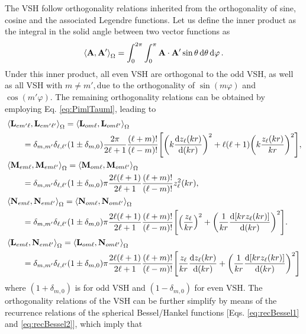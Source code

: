 The VSH follow orthogonality relations inherited from the orthogonality of sine, cosine and the associated Legendre functions. Let us define the inner product as the integral in the solid angle between two vector functions as
%
\begin{align}
\ev{\vb{A},\vb{A}'}_\Omega = \int_0^{2\pi}\int_0^{\pi} \vb{A}\cdot\vb{A}'\sin\theta\dd{\theta}\dd{\varphi}.
\label{eq:inner}
\end{align}
%
Under this inner product, all even VSH are orthogonal to the odd VSH, as well as all VSH  with $m\neq m', $due to the orthogonality of $\sin(m\varphi)$ and $\cos(m'\varphi)$. The remaining orthogonality relations  can be obtained by employing Eq. \eqref{eq:PimlTauml}, leading to
%
\begin{align}
&\ev{\vb{L}_{em'\ell},\vb{L}_{em'\ell'}}_\Omega = \ev{\vb{L}_{om\ell},\vb{L}_{om\ell'}}_\Omega \notag\\
	 &\hspace*{2em} =
 	\delta_{m,m'}\delta_{\ell,\ell'} (1\pm\delta_{m,0})
 	\frac{2\pi}{2\ell+1}\frac{(\ell+m)!}{(\ell-m)!}
 	\qty[\qty(k\dv{z_\ell(kr)}{(kr)})^2 + \ell(\ell+1)\qty(k\frac{z_\ell(kr)}{kr})^2],
    \label{eq:LL}\\
%
&\ev{\vb{M}_{em\ell},\vb{M}_{em\ell'}}_\Omega = \ev{\vb{M}_{om\ell},\vb{M}_{om\ell'}}_\Omega \notag\\
		 &\hspace*{2em} =
	\delta_{m,m'}\delta_{\ell,\ell'} (1\pm\delta_{m,0})
	\pi \frac{2  \ell(\ell+1)}{2\ell+1}\frac{(\ell+m)!}{(\ell-m)!}
	z_{\ell}^2(kr),\\
%
&\ev{\vb{N}_{em\ell},\vb{N}_{em\ell'}}_\Omega = \ev{\vb{N}_{om\ell},\vb{N}_{om\ell'}}_\Omega  \notag\\
	 &\hspace*{2em} =
	 \delta_{m,m'}\delta_{\ell,\ell'} (1\pm\delta_{m,0})
	\pi \frac{2  \ell(\ell+1)}{2\ell+1}\frac{(\ell+m)!}{(\ell-m)!}
	\qty[\qty(\frac{ z_{\ell}}{kr})^2 + \qty(\frac{1}{kr}\dv{[kr z_\ell(kr)]}{(kr)})^2]. \\
&\ev{\vb{L}_{em\ell},\vb{N}_{em\ell'}}_\Omega = \ev{\vb{L}_{om\ell},\vb{N}_{om\ell'}}_\Omega \notag\\
	 &\hspace*{2em} =
	 \delta_{m,m'}\delta_{\ell,\ell'} (1\pm\delta_{m,0})
	\pi \frac{2  \ell(\ell+1)}{2\ell+1}\frac{(\ell+m)!}{(\ell-m)!}
	\qty[\frac{ z_{\ell}}{kr}\dv{z_\ell(kr)}{(kr)} + \qty(\frac{1}{kr}\dv{[kr z_\ell(kr)]}{(kr)})^2]
    \label{eq:LM}
\end{align}
%
where $(1+\delta_{m,0}) $ is for odd VSH and $(1-\delta_{m,0}) $ for even VSH. The orthogonality relations of the VSH can be further simplify by means of the recurrence relations of the spherical Bessel/Hankel functions [Eqs. \eqref{eq:recBessel1} and \eqref{eq:recBessel2}], which imply that
